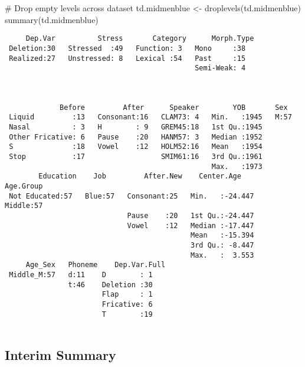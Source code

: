 \documentclass[
  12pt,
  letterpaper]{article}
\newenvironment{Shaded}{\begin{snugshade}}{\end{snugshade}}
\newcommand{\CommentTok}[1]{\textcolor[rgb]{0.37,0.37,0.37}{#1}}
\newcommand{\FunctionTok}[1]{\textcolor[rgb]{0.28,0.35,0.67}{#1}}
\newcommand{\NormalTok}[1]{\textcolor[rgb]{0.00,0.23,0.31}{#1}}
\newcommand{\OtherTok}[1]{\textcolor[rgb]{0.00,0.23,0.31}{#1}}
\begin{document}
\begin{Shaded}
\begin{Highlighting}[]
\CommentTok{\# Drop empty levels across dataset}
\NormalTok{td.midmenblue }\OtherTok{\textless{}{-}} \FunctionTok{droplevels}\NormalTok{(td.midmenblue)}
\FunctionTok{summary}\NormalTok{(td.midmenblue)}
\end{Highlighting}
\end{Shaded}

\begin{verbatim}
     Dep.Var          Stress       Category      Morph.Type
 Deletion:30   Stressed  :49   Function: 3   Mono     :38  
 Realized:27   Unstressed: 8   Lexical :54   Past     :15  
                                             Semi-Weak: 4  
                                                           
                                                           
                                                           
             Before         After      Speaker        YOB       Sex   
 Liquid         :13   Consonant:16   CLAM73: 4   Min.   :1945   M:57  
 Nasal          : 3   H        : 9   GREM45:18   1st Qu.:1945         
 Other Fricative: 6   Pause    :20   HANM57: 3   Median :1952         
 S              :18   Vowel    :12   HOLM52:16   Mean   :1954         
 Stop           :17                  SMIM61:16   3rd Qu.:1961         
                                                 Max.   :1973         
        Education    Job         After.New    Center.Age       Age.Group 
 Not Educated:57   Blue:57   Consonant:25   Min.   :-24.447   Middle:57  
                             Pause    :20   1st Qu.:-24.447              
                             Vowel    :12   Median :-17.447              
                                            Mean   :-15.394              
                                            3rd Qu.: -8.447              
                                            Max.   :  3.553              
     Age_Sex   Phoneme    Dep.Var.Full
 Middle_M:57   d:11    D        : 1   
               t:46    Deletion :30   
                       Flap     : 1   
                       Fricative: 6   
                       T        :19   
                                      
\end{verbatim}

\hypertarget{interim-summary}{%
\subsection{Interim Summary}\label{interim-summary}}
\end{document}

